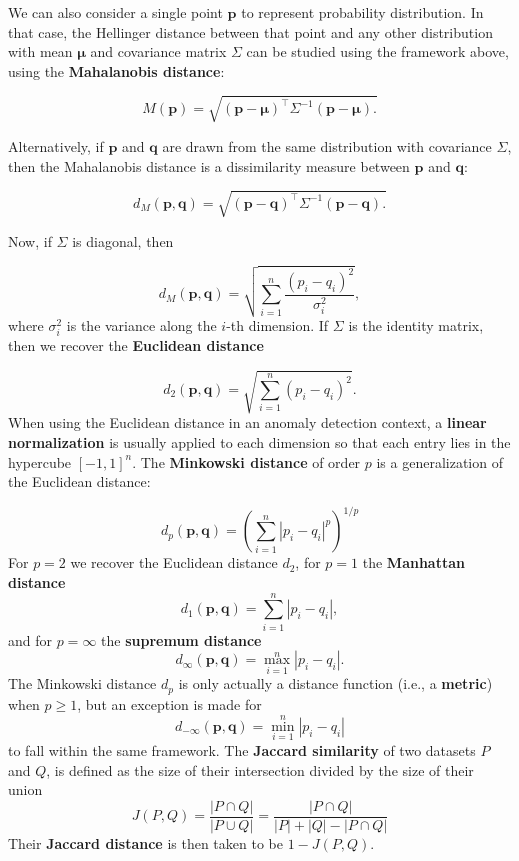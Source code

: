 We can also consider a single point $\mathbf{p}$ to  represent probability distribution. In that case, the Hellinger distance between that point and any other distribution with mean $\mathbf{\mu}$ and covariance matrix $\Sigma$ can be studied using the framework above, using the \textbf{Mahalanobis distance}:

$$
M(\mathbf{p})=\sqrt{(\mathbf{p} - \mathbf{\mu})^{\!\top} \Sigma^{-1} (\mathbf{p} - \mathbf{\mu}).}
$$

\noindent Alternatively, if $\mathbf{p}$ and $\mathbf{q}$ are drawn from the same distribution with covariance $\Sigma$, then the Mahalanobis distance is a dissimilarity measure between $\mathbf{p}$ and $\mathbf{q}$: 

$$
d_M(\mathbf{p},\mathbf{q})=\sqrt{(\mathbf{p} - \mathbf{q})^{\!\top} \Sigma^{-1} (\mathbf{p} - \mathbf{q}).}
$$

\noindent Now, if  $\Sigma$ is diagonal, then 

$$
d_M(\mathbf{p},\mathbf{q})=\sqrt{\sum_{i=1}^n \frac{(p_i - q_i)^2}{\sigma_i^2}},
$$
where $\sigma_i^2$ is the variance along the $i$-th dimension.
If $\Sigma$ is the identity matrix, then we recover the \textbf{Euclidean distance}

$$
d_2(\mathbf{p},\mathbf{q})=\sqrt{\sum_{i=1}^n (p_i - q_i)^2}.
$$
\noindent When using the Euclidean distance in an anomaly detection context, a \textbf{linear normalization} is usually applied to each dimension so that each entry lies in the hypercube  $[-1,1]^n$.
\newpage\noindent The \textbf{Minkowski distance} of order $p$ is a generalization of the Euclidean distance:

$$
d_p(\mathbf{p},\mathbf{q})=\left( \sum_{i=1}^n |p_i - q_i|^p \right)^{1/p}
$$
For $p=2$ we recover the Euclidean distance $d_2$, 
for $p=1$ the \textbf{Manhattan distance} $$d_1(\mathbf{p},\mathbf{q})=\sum_{i=1}^n|p_i-q_i|,$$ 
and for $p=\infty$ the \textbf{supremum distance} $$d_{\infty}(\mathbf{p},\mathbf{q})=\max_{i=1}^n |p_i - q_i|.$$ 
The Minkowski distance $d_p$ is only actually a distance function (i.e., a \textbf{metric}) when  $p \geq 1$, but an exception is made for 
$$
d_{-\infty}(\mathbf{p},\mathbf{q})=\min_{i=1}^n |p_i - q_i|
$$
to fall within the same framework. \newline\newline The \textbf{Jaccard similarity} of two datasets $P$ and $Q$, is defined as the size of their intersection divided by the size of their union
$$
J(P,Q)
= \frac{|P \cap Q|}{|P \cup Q|}
= \frac{|P \cap Q|}{|P| + |Q| - |P \cap Q|}
$$
Their \textbf{Jaccard distance} is then taken to be $1 - J(P,Q)$.

